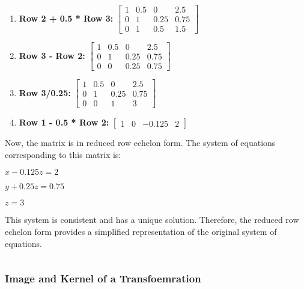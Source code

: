 \documentclass[11pt]{article}
\makeatletter
\newcommand{\boxspacing}{\kern\kvtcb@left@rule\kern\kvtcb@boxsep}
\newcommand{\prompt}[4]{
        {\ttfamily\llap{{\color{#2}[#3]:\hspace{3pt}#4}}\vspace{-\baselineskip}}
    }
\makeatother
\begin{document}
\begin{enumerate}
\item
  \textbf{Row 2 + 0.5 * Row 3:} $ \begin{bmatrix} 1 & 0.5 & 0 & 2.5 \\ 0 & 1 & 0.25 & 0.75 \\ 0 & 1 & 0.5 & 1.5 \end{bmatrix} $ 
\item
  \textbf{Row 3 - Row 2:} $ \begin{bmatrix} 1 & 0.5 & 0 & 2.5 \\ 0 & 1 & 0.25 & 0.75 \\ 0 & 0 & 0.25 & 0.75 \end{bmatrix}  $ 
\item
  \textbf{Row 3/0.25:} $ \begin{bmatrix} 1 & 0.5 & 0 & 2.5 \\ 0 & 1 & 0.25 & 0.75 \\ 0 & 0 & 1 & 3 \end{bmatrix} $ 
\item
  \textbf{Row 1 - 0.5 * Row 2:} $ \begin{bmatrix} 1 & 0 & -0.125 & 2 \end{bmatrix} $ 
\end{enumerate}

Now, the matrix is in reduced row echelon form. The system of equations
corresponding to this matrix is:

$  x - 0.125z = 2 $ 

$  y + 0.25z = 0.75 $ 

$  z = 3 $ 

This system is consistent and has a unique solution. Therefore, the
reduced row echelon form provides a simplified representation of the
original system of equations.

    \begin{tcolorbox}[breakable, size=fbox, boxrule=1pt, pad at break*=1mm,colback=cellbackground, colframe=cellborder]
\prompt{In}{incolor}{ }{\boxspacing}
\begin{Verbatim}[commandchars=\\\{\}]

\end{Verbatim}
\end{tcolorbox}

    \hypertarget{image-and-kernel-of-a-transfoemration}{%
\subsubsection{Image and Kernel of a
Transfoemration}\label{image-and-kernel-of-a-transfoemration}}
\end{document}
